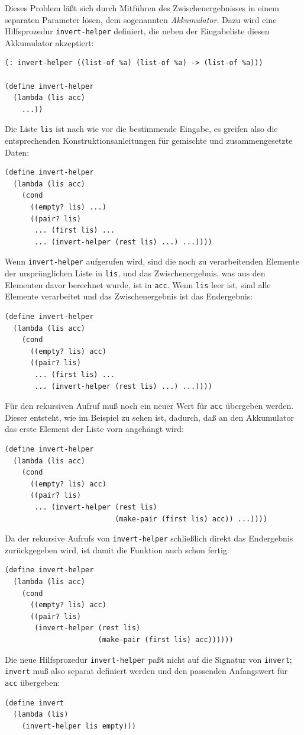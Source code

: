 Dieses Problem läßt sich durch Mitführen des Zwischenergebnisses in
einem separaten Parameter lösen, dem sogenannten
\textit{Akkumulator}.  Dazu wird eine
Hilfsprozedur \texttt{invert-helper} definiert, die neben der Eingabeliste
diesen Akkumulator akzeptiert:
%
\begin{verbatim}
(: invert-helper ((list-of %a) (list-of %a) -> (list-of %a)))

(define invert-helper
  (lambda (lis acc)
    ...))
\end{verbatim}
%
Die Liste \texttt{lis} ist nach wie vor die bestimmende Eingabe, es
greifen also die entsprechenden Konstruktionsanleitungen für gemischte
und zusammengesetzte Daten:
%
\begin{verbatim}
(define invert-helper
  (lambda (lis acc)
    (cond
      ((empty? lis) ...)
      ((pair? lis)
       ... (first lis) ...
       ... (invert-helper (rest lis) ...) ...))))
\end{verbatim}
%
Wenn \texttt{invert-helper} aufgerufen wird, sind die noch zu
verarbeitenden Elemente der ursprünglichen Liste in \texttt{lis}, und
das Zwischenergebnis, was aus den Elementen davor berechnet wurde, ist
in \texttt{acc}.  Wenn \texttt{lis} leer ist, sind alle Elemente
verarbeitet und das Zwischenergebnis ist das Endergebnis:
%
\begin{verbatim}
(define invert-helper
  (lambda (lis acc)
    (cond
      ((empty? lis) acc)
      ((pair? lis)
       ... (first lis) ...
       ... (invert-helper (rest lis) ...) ...))))
\end{verbatim}
%
Für den rekursiven Aufruf muß noch ein neuer Wert für \texttt{acc}
übergeben werden.  Dieser entsteht, wie im Beispiel zu sehen ist,
dadurch, daß an den Akkumulator das erste Element der Liste vorn
angehängt wird:
%
\begin{verbatim}
(define invert-helper
  (lambda (lis acc)
    (cond
      ((empty? lis) acc)
      ((pair? lis)
       ... (invert-helper (rest lis)
                          (make-pair (first lis) acc)) ...))))
\end{verbatim}
%
Da der rekursive Aufrufs von \texttt{invert-helper} schließlich direkt das
Endergebnis zurückgegeben wird, ist damit die Funktion auch schon fertig:
%
\begin{verbatim}
(define invert-helper
  (lambda (lis acc)
    (cond
      ((empty? lis) acc)
      ((pair? lis)
       (invert-helper (rest lis)
                      (make-pair (first lis) acc))))))
\end{verbatim}
%
Die neue Hilfsprozedur \texttt{invert-helper} paßt nicht auf die Signatur
von \texttt{invert}; \texttt{invert} muß also separat definiert werden
und den passenden Anfangswert für \texttt{acc} übergeben:
%
\begin{verbatim}
(define invert
  (lambda (lis)
    (invert-helper lis empty)))
\end{verbatim}
%

